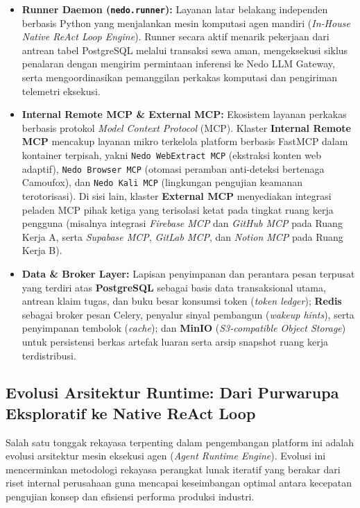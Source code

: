 \begin{itemize}
  \item \textbf{Runner Daemon (\texttt{nedo.runner}):} Layanan latar belakang independen berbasis Python yang menjalankan mesin komputasi agen mandiri (\textit{In-House Native ReAct Loop Engine}). Runner secara aktif menarik pekerjaan dari antrean tabel PostgreSQL melalui transaksi sewa aman, mengeksekusi siklus penalaran dengan mengirim permintaan inferensi ke Nedo LLM Gateway, serta mengoordinasikan pemanggilan perkakas komputasi dan pengiriman telemetri eksekusi.
  \item \textbf{Internal Remote MCP \& External MCP:} Ekosistem layanan perkakas berbasis protokol \textit{Model Context Protocol} (MCP). Klaster \textbf{Internal Remote MCP} mencakup layanan mikro terkelola platform berbasis FastMCP dalam kontainer terpisah, yakni \texttt{Nedo WebExtract MCP} (ekstraksi konten web adaptif), \texttt{Nedo Browser MCP} (otomasi peramban anti-deteksi bertenaga Camoufox), dan \texttt{Nedo Kali MCP} (lingkungan pengujian keamanan terotorisasi). Di sisi lain, klaster \textbf{External MCP} menyediakan integrasi peladen MCP pihak ketiga yang terisolasi ketat pada tingkat ruang kerja pengguna (misalnya integrasi \textit{Firebase MCP} dan \textit{GitHub MCP} pada Ruang Kerja A, serta \textit{Supabase MCP}, \textit{GitLab MCP}, dan \textit{Notion MCP} pada Ruang Kerja B).
  \item \textbf{Data \& Broker Layer:} Lapisan penyimpanan dan perantara pesan terpusat yang terdiri atas \textbf{PostgreSQL} sebagai basis data transaksional utama, antrean klaim tugas, dan buku besar konsumsi token (\textit{token ledger}); \textbf{Redis} sebagai broker pesan Celery, penyalur sinyal pembangun (\textit{wakeup hints}), serta penyimpanan tembolok (\textit{cache}); dan \textbf{MinIO} (\textit{S3-compatible Object Storage}) untuk persistensi berkas artefak luaran serta arsip snapshot ruang kerja terdistribusi.
\end{itemize}

\subsection{Evolusi Arsitektur Runtime: Dari Purwarupa Eksploratif ke Native ReAct Loop}

Salah satu tonggak rekayasa terpenting dalam pengembangan platform ini adalah evolusi arsitektur mesin eksekusi agen (\textit{Agent Runtime Engine}). Evolusi ini mencerminkan metodologi rekayasa perangkat lunak iteratif yang berakar dari riset internal perusahaan guna mencapai keseimbangan optimal antara kecepatan pengujian konsep dan efisiensi performa produksi industri.

